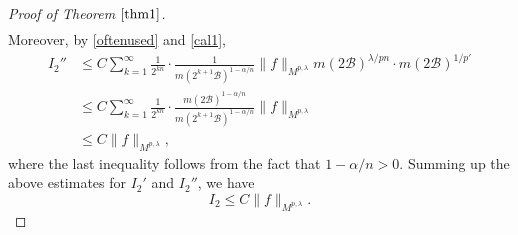 \documentclass[10pt, reqno]{amsart}
\theoremstyle{definition}
\theoremstyle{remark}
\numberwithin{equation}{section}
\begin{document}
\begin{proof}[Proof of Theorem $\ref{thm1}$]
\begin{equation*}
\begin{split}
\end{split}
\end{equation*}
Moreover, by \eqref{oftenused} and \eqref{cal1},
\begin{equation*}
\begin{split}
I_2''&\leq C\sum_{k=1}^{\infty}\frac{1}{2^{kn}}\cdot\frac{1}{m(2^{k+1}\mathcal{B})^{1-\alpha/n}}   \big\|f\big\|_{M^{p,\lambda}}m(2\mathcal{B})^{\lambda/{pn}}\cdot m(2\mathcal{B})^{1/{p'}}\\
&\leq C\sum_{k=1}^{\infty}\frac{1}{2^{kn}}\cdot\frac{m(2\mathcal{B})^{1-\alpha/n}}{m(2^{k+1}\mathcal{B})^{1-\alpha/n}}
\big\|f\big\|_{M^{p,\lambda}}\\
&\leq C\big\|f\big\|_{M^{p,\lambda}},
\end{split}
\end{equation*}
where the last inequality follows from the fact that $1-\alpha/n>0$. Summing up the above estimates for $I_2'$ and $I_2''$, we have
\begin{equation*}
I_2\leq C\big\|f\big\|_{M^{p,\lambda}}.
\end{equation*}


\end{proof}
\end{document}
